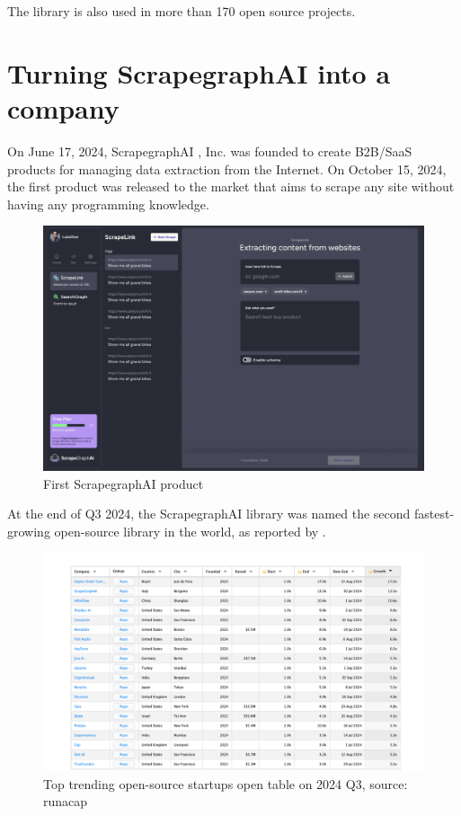 The library is also used in more than 170 open source projects.
\section{Turning ScrapegraphAI  into a company}
On June 17, 2024, ScrapegraphAI , Inc. was founded to create B2B/SaaS products for managing data extraction from the Internet.
On October 15, 2024, the first product was released to the market that aims to scrape any site without having any programming knowledge.

\begin{figure}[H]
    \centering
    \includegraphics[width=1\linewidth]{Assets/webapp.png}
    \caption{First ScrapegraphAI  product}
    \label{fig:enter-label}
\end{figure}

At the end of Q3 2024, the ScrapegraphAI  library was named the second fastest-growing open-source library in the world, as reported by \cite{runacap2024}.

\begin{figure}[H]
    \centering
    \includegraphics[width=0.95\linewidth]{Assets/growing_companies.png}
    \caption{Top trending open-source startups open table on 2024 Q3, source: runacap}
    \label{fig:enter-label}

\end{figure}

